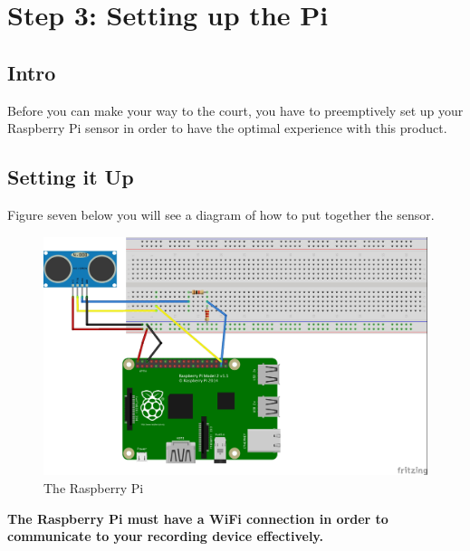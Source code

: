 \chapter{Step 3: Setting up the Pi}

\setlength{\parindent}{0cm}

\section{Intro}
Before you can make your way to the court, you have to preemptively set up your Raspberry Pi sensor in order to have the optimal experience with this product.

\section{Setting it Up}
Figure seven below you will see a diagram of how to put together the sensor.
\begin{figure}[h]
    \caption{The Raspberry Pi}
    \includegraphics[width = 1 \textwidth]{Pieces/Sensor.jpg}
\end{figure}

\textbf{The Raspberry Pi must have a WiFi connection in order to communicate to your recording device effectively.}
